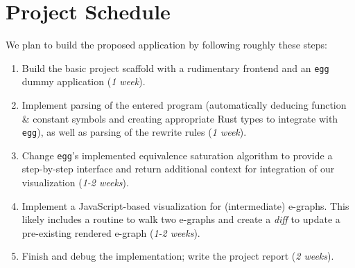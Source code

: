 \documentclass[letterpaper,twocolumn,10pt]{article}
\begin{document}
\section{Project Schedule}

We plan to build the proposed application by following roughly these steps:
\begin{enumerate}
    \item Build the basic project scaffold with a rudimentary frontend and an \texttt{egg} dummy application (\textit{1 week}).
    \item Implement parsing of the entered program (automatically deducing function \& constant symbols and creating appropriate Rust types to integrate with \texttt{egg}), as well as parsing of the rewrite rules (\textit{1 week}).
    \item Change \texttt{egg}'s implemented equivalence saturation algorithm to provide a step-by-step interface and return additional context for integration of our visualization (\textit{1-2 weeks}).
    \item Implement a JavaScript-based visualization for (intermediate) e-graphs. This likely includes a routine to walk two e-graphs and create a \textit{diff} to update a pre-existing rendered e-graph (\textit{1-2 weeks}).
    \item Finish and debug the implementation; write the project report (\textit{2 weeks}).
\end{enumerate}



\end{document}
